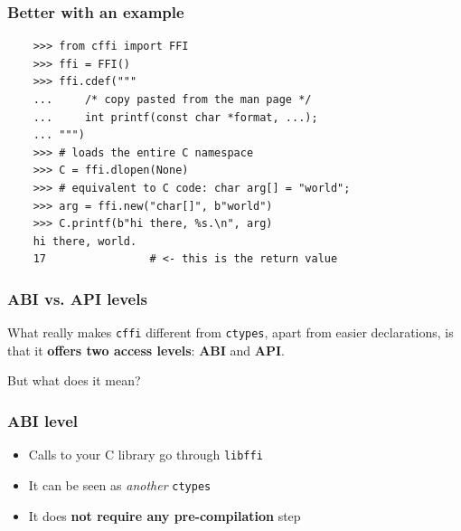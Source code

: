 \documentclass[handout]{beamer}
\begin{document}
\begin{frame}[fragile]
  \frametitle{Better with an example}

  \begin{verbatim}
    >>> from cffi import FFI
    >>> ffi = FFI()
    >>> ffi.cdef("""
    ...     /* copy pasted from the man page */
    ...     int printf(const char *format, ...);
    ... """)
    >>> # loads the entire C namespace
    >>> C = ffi.dlopen(None)
    >>> # equivalent to C code: char arg[] = "world";
    >>> arg = ffi.new("char[]", b"world")
    >>> C.printf(b"hi there, %s.\n", arg)
    hi there, world.
    17                # <- this is the return value
  \end{verbatim}
\end{frame}

\begin{frame}
  \frametitle{ABI vs. API levels}

  What really makes \texttt{cffi} different from \texttt{ctypes}, apart from
  easier declarations, is that it \textbf{offers two access levels}:
  \textbf{ABI} and \textbf{API}.

  \begin{center}
    \Huge But what does it mean?
  \end{center}
\end{frame}

\begin{frame}
  \frametitle{ABI level}

  \begin{itemize}
    \item<1-> Calls to your C library go through \texttt{libffi}
    \item<2-> It can be seen as \textit{another} \texttt{ctypes}
    \item<3-> It does \textbf{not require any pre-compilation} step
  \end{itemize}

\end{frame}
\end{document}
